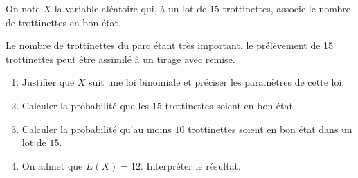 On note $X$ la variable aléatoire qui, à un lot de $15$ trottinettes, associe le nombre de trottinettes en bon état.

Le nombre de trottinettes du parc étant très important, le prélèvement de 15 trottinettes peut être assimilé à un tirage avec remise.

\medskip

\begin{enumerate}
\item Justifier que $X$ suit une loi binomiale et préciser les paramètres de cette loi.
\item Calculer la probabilité que les $15$ trottinettes soient en bon état.
\item Calculer la probabilité qu'au moins $10$ trottinettes soient en bon état dans un
lot de $15$.
\item On admet que $E(X) = 12$. Interpréter le résultat.
\end{enumerate}

